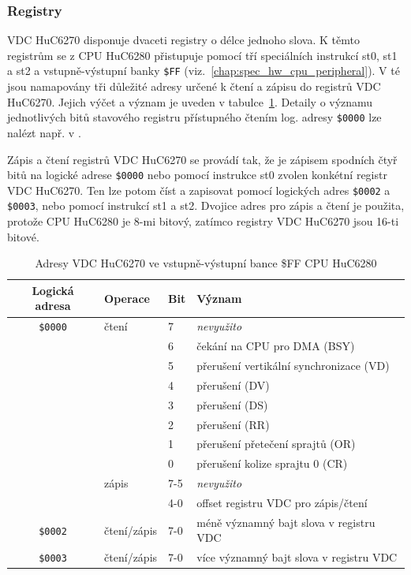 
\subsubsection{Registry}\label{chap:spec_hw_vdc_regs}

VDC HuC6270 disponuje dvaceti registry o délce jednoho slova. K těmto registrům se
z CPU HuC6280 přistupuje pomocí tří speciálních instrukcí {\sc st0}, {\sc st1}
a {\sc st2} a vstupně-výstupní banky {\tt \$FF}
(viz.~\ref{chap:spec_hw_cpu_peripheral}). V té jsou namapovány tři důležité adresy
určené k čtení a zápisu do registrů VDC HuC6270. Jejich výčet a význam je uveden v
tabulce~\ref{tab:vdc_ffpage}. Detaily o významu jednotlivých bitů stavového
registru přístupného čtením log. adresy {\tt \$0000} lze nalézt např. v
\cite{MacDonald02}.

Zápis a čtení registrů VDC HuC6270 se provádí tak, že je zápisem spodních čtyř
bitů na logické adrese {\tt \$0000} nebo pomocí instrukce {\sc st0} zvolen
konkétní registr VDC HuC6270. Ten lze potom číst a zapisovat pomocí logických
adres {\tt \$0002} a {\tt \$0003}, nebo pomocí instrukcí {\sc st1} a {\sc st2}.
Dvojice adres pro zápis a čtení je použita, protože CPU HuC6280 je 8-mi bitový,
zatímco registry VDC HuC6270 jsou 16-ti bitové.

\begin{table}[ht]
\begin{center}
\begin{tabular}{|c|l|l|l|}
\hline
\textbf{Logická adresa} & \textbf{Operace} & \textbf{Bit} & \textbf{Význam} \\
\hline
	{\tt \$0000}
		& čtení
			& 7 & {\em nevyužito} \\
			& & 6 & čekání na CPU pro DMA (BSY) \\
			& & 5 & přerušení vertikální synchronizace (VD) \\
			& & 4 & přerušení \uv{konec DMA VRAM/VRAM} (DV) \\
			& & 3 & přerušení \uv{konec DMA VRAM/{\it SAT}} (DS) \\
			& & 2 & přerušení \uv{raster compare} (RR) \\
			& & 1 & přerušení přetečení sprajtů (OR) \\
			& & 0 & přerušení kolize sprajtu 0 (CR) \\
		& zápis
			& 7-5 & {\em nevyužito} \\
			& & 4-0 & offset registru VDC pro zápis/čtení \\
\hline
	{\tt \$0002}
		& čtení/zápis
		& 7-0 & méně významný bajt slova v registru VDC \\
\hline
	{\tt \$0003}
		& čtení/zápis
		& 7-0 & více významný bajt slova v registru VDC \\
\hline
\end{tabular}
\end{center}
	\caption{Adresy VDC HuC6270 ve vstupně-výstupní bance \$FF CPU
	HuC6280\label{tab:vdc_ffpage}}
\end{table}

